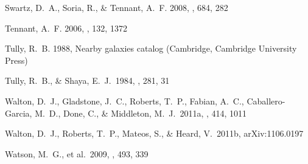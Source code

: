 \documentclass{article}
\begin{document}
\begin{thebibliography}{47}
{Swartz}, D.~A., {Soria}, R., \& {Tennant}, A.~F. 2008, \apj, 684, 282

{Tennant}, A.~F. 2006, \aj, 132, 1372

{Tully}, R.~B. 1988, {Nearby galaxies catalog} (Cambridge, Cambridge University
  Press)

 Tully, R.~B., \& Shaya, E.~J.\ 1984, \apj, 281, 31 

 Walton, D.~J., Gladstone, J.~C., Roberts, T.~P., Fabian, A.~C., Caballero-Garcia, M.~D., 
 Done, C., \& Middleton, M.~J.\ 2011a, \mnras, 414, 1011 

 Walton, D.~J., Roberts, T.~P., Mateos, S., \& Heard, V.\ 2011b, arXiv:1106.0197 

 Watson, M.~G., et al.\ 2009, \aap, 493, 339 

\end{thebibliography}
\end{document}
